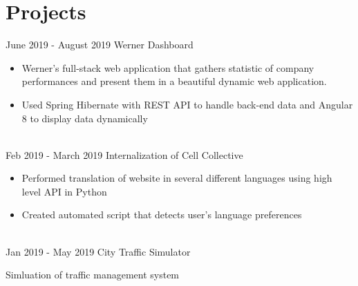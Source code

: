 \documentclass[letterpaper]{twentysecondcv} %
\begin{document}
\begin{twenty}
        
\end{twenty}


\section{Projects}
\begin{twenty}

    \twentyitem
    	{June 2019 - }
		{August 2019}
        {Werner Dashboard}
        {} %
        {}
        {
        {\begin{itemize}
        \item Werner's full-stack web application that gathers statistic of company performances and present them in a beautiful dynamic web application.
        \item Used Spring Hibernate with REST API to handle back-end data and Angular 8 to display data dynamically
        
		\end{itemize}}
        }
    \\
    
    \twentyitem
    	{Feb 2019 - }
		{March 2019}
        {Internalization of Cell Collective}
        {} %
        {}
        {
        {\begin{itemize}
        \item Performed translation of website in several different languages using high level API in Python
        \item Created automated script that detects user's language preferences
		\end{itemize}}
        }
    \\
	\twentyitem
    	{Jan 2019 - }
		{May 2019}
        {City Traffic Simulator}
        {} %
        {}
        {
       	Simluation of traffic management system
       	
}
\end{twenty}
\end{document}
